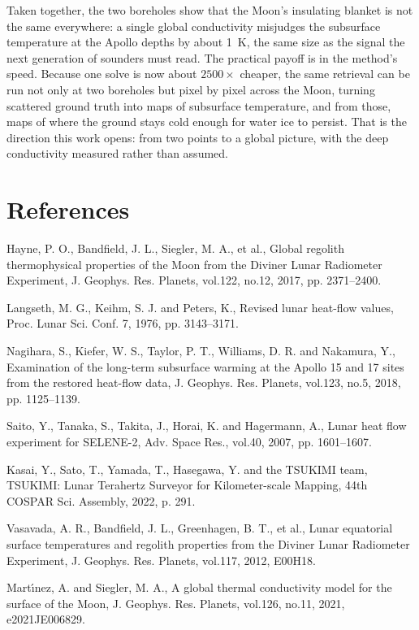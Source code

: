 \documentclass[10pt,a4paper,twocolumn]{article}
\begin{document}
Taken together, the two boreholes show that the Moon's insulating
blanket is not the same everywhere: a single global conductivity
misjudges the subsurface temperature at the Apollo depths by about
1~K, the same size as the signal the next generation of sounders must
read. The practical payoff is in the method's speed. Because one solve
is now about $2500\times$ cheaper, the same retrieval can be run not
only at two boreholes but pixel by pixel across the Moon, turning
scattered ground truth into maps of subsurface temperature, and from
those, maps of where the ground stays cold enough for water ice to
persist. That is the direction this work opens: from two points to a
global picture, with the deep conductivity measured rather than
assumed.

\section*{References}
\begin{list}{}{\setlength{\leftmargin}{1.5em}\setlength{\itemindent}{-1.5em}
\setlength{\itemsep}{0pt}\setlength{\parsep}{0pt}}
\item[] [1] Hayne, P. O., Bandfield, J. L., Siegler, M. A., et al.,
Global regolith thermophysical properties of the Moon from the Diviner
Lunar Radiometer Experiment, J. Geophys. Res. Planets, vol.122, no.12,
2017, pp. 2371--2400.
\item[] [2] Langseth, M. G., Keihm, S. J. and Peters, K., Revised lunar
heat-flow values, Proc. Lunar Sci. Conf. 7, 1976, pp. 3143--3171.
\item[] [3] Nagihara, S., Kiefer, W. S., Taylor, P. T., Williams, D. R.
and Nakamura, Y., Examination of the long-term subsurface warming at the
Apollo 15 and 17 sites from the restored heat-flow data, J. Geophys.
Res. Planets, vol.123, no.5, 2018, pp. 1125--1139.
\item[] [4] Saito, Y., Tanaka, S., Takita, J., Horai, K. and
Hagermann, A., Lunar heat flow experiment for SELENE-2, Adv. Space Res.,
vol.40, 2007, pp. 1601--1607.
\item[] [5] Kasai, Y., Sato, T., Yamada, T., Hasegawa, Y. and the
TSUKIMI team, TSUKIMI: Lunar Terahertz Surveyor for Kilometer-scale
Mapping, 44th COSPAR Sci. Assembly, 2022, p. 291.
\item[] [6] Vasavada, A. R., Bandfield, J. L., Greenhagen, B. T., et al.,
Lunar equatorial surface temperatures and regolith properties from the
Diviner Lunar Radiometer Experiment, J. Geophys. Res. Planets, vol.117,
2012, E00H18.
\item[] [7] Mart\'{\i}nez, A. and Siegler, M. A., A global thermal
conductivity model for the surface of the Moon, J. Geophys. Res.
Planets, vol.126, no.11, 2021, e2021JE006829.
\end{list}
\end{document}
